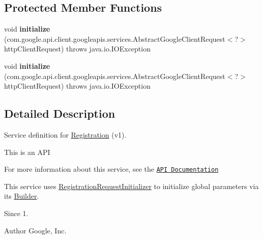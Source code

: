 \subsection*{Protected Member Functions}
\begin{DoxyCompactItemize}
\item 
\hypertarget{classcom_1_1example_1_1lusifer_1_1myapplication_1_1backend_1_1registration_1_1_registration_a3285703b5e1a1e51a386c756a0a83312}{}void {\bfseries initialize} (com.\+google.\+api.\+client.\+googleapis.\+services.\+Abstract\+Google\+Client\+Request$<$?$>$ http\+Client\+Request)  throws java.\+io.\+I\+O\+Exception \label{classcom_1_1example_1_1lusifer_1_1myapplication_1_1backend_1_1registration_1_1_registration_a3285703b5e1a1e51a386c756a0a83312}

\item 
\hypertarget{classcom_1_1example_1_1lusifer_1_1myapplication_1_1backend_1_1registration_1_1_registration_a3285703b5e1a1e51a386c756a0a83312}{}void {\bfseries initialize} (com.\+google.\+api.\+client.\+googleapis.\+services.\+Abstract\+Google\+Client\+Request$<$?$>$ http\+Client\+Request)  throws java.\+io.\+I\+O\+Exception \label{classcom_1_1example_1_1lusifer_1_1myapplication_1_1backend_1_1registration_1_1_registration_a3285703b5e1a1e51a386c756a0a83312}

\end{DoxyCompactItemize}


\subsection{Detailed Description}
Service definition for \hyperlink{classcom_1_1example_1_1lusifer_1_1myapplication_1_1backend_1_1registration_1_1_registration}{Registration} (v1).

This is an A\+P\+I 

For more information about this service, see the \href{}{\tt A\+P\+I Documentation} 

This service uses \hyperlink{classcom_1_1example_1_1lusifer_1_1myapplication_1_1backend_1_1registration_1_1_registration_request_initializer}{Registration\+Request\+Initializer} to initialize global parameters via its \hyperlink{}{Builder}. 

\begin{DoxySince}{Since}
1. 
\end{DoxySince}
\begin{DoxyAuthor}{Author}
Google, Inc. 
\end{DoxyAuthor}


